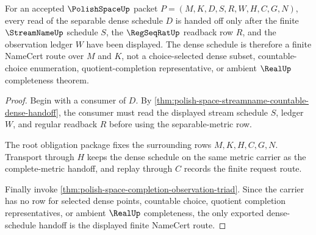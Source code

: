 \begin{theorem}
\label{thm:polish-space-separable-dense-schedule-handoff}
For an accepted $\PolishSpaceUp$ packet $P=(M,K,D,S,R,W,H,C,G,N)$, every read of the separable dense schedule $D$ is handed off only after the finite $\StreamNameUp$ schedule $S$, the $\RegSeqRatUp$ readback row $R$, and the observation ledger $W$ have been displayed. The dense schedule is therefore a finite NameCert route over $M$ and $K$, not a choice-selected dense subset, countable-choice enumeration, quotient-completion representative, or ambient $\RealUp$ completeness theorem.
\end{theorem}
\begin{proof}
Begin with a consumer of $D$. By \autoref{thm:polish-space-streamname-countable-dense-handoff}, the consumer must read the displayed stream schedule $S$, ledger $W$, and regular readback $R$ before using the separable-metric row.

The root obligation package fixes the surrounding rows $M,K,H,C,G,N$. Transport through $H$ keeps the dense schedule on the same metric carrier as the complete-metric handoff, and replay through $C$ records the finite request route.

Finally invoke \autoref{thm:polish-space-completion-observation-triad}. Since the carrier has no row for selected dense points, countable choice, quotient completion representatives, or ambient $\RealUp$ completeness, the only exported dense-schedule handoff is the displayed finite NameCert route.
\end{proof}

